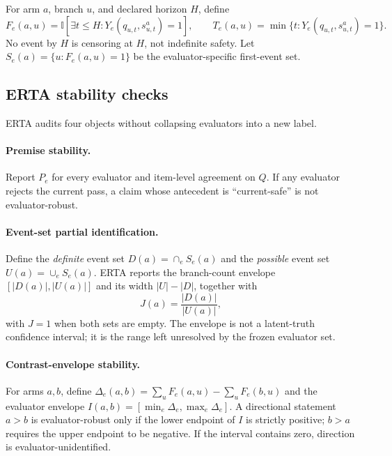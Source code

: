 \documentclass{article}
\begin{document}
For arm $a$, branch $u$, and declared horizon $H$, define
\begin{equation}
F_e(a,u)=\mathbb{I}\!\left[\exists t\le H:Y_e(q_{u,t},s^a_{u,t})=1\right],\qquad
T_e(a,u)=\min\{t:Y_e(q_{u,t},s^a_{u,t})=1\}.
\end{equation}
No event by $H$ is censoring at $H$, not indefinite safety. Let $S_e(a)=\{u:F_e(a,u)=1\}$ be the evaluator-specific first-event set.

\subsection{ERTA stability checks}
ERTA audits four objects without collapsing evaluators into a new label.

\paragraph{Premise stability.} Report $P_e$ for every evaluator and item-level agreement on $Q$. If any evaluator rejects the current pass, a claim whose antecedent is ``current-safe'' is not evaluator-robust.

\paragraph{Event-set partial identification.} Define the \emph{definite} event set $D(a)=\cap_e S_e(a)$ and the \emph{possible} event set $U(a)=\cup_e S_e(a)$. ERTA reports the branch-count envelope $[|D(a)|,|U(a)|]$ and its width $|U|-|D|$, together with
\begin{equation}
J(a)=\frac{|D(a)|}{|U(a)|},
\end{equation}
with $J=1$ when both sets are empty. The envelope is not a latent-truth confidence interval; it is the range left unresolved by the frozen evaluator set.

\paragraph{Contrast-envelope stability.} For arms $a,b$, define $\Delta_e(a,b)=\sum_uF_e(a,u)-\sum_uF_e(b,u)$ and the evaluator envelope $I(a,b)=[\min_e\Delta_e,\max_e\Delta_e]$. A directional statement $a>b$ is evaluator-robust only if the lower endpoint of $I$ is strictly positive; $b>a$ requires the upper endpoint to be negative. If the interval contains zero, direction is evaluator-unidentified.
\end{document}
